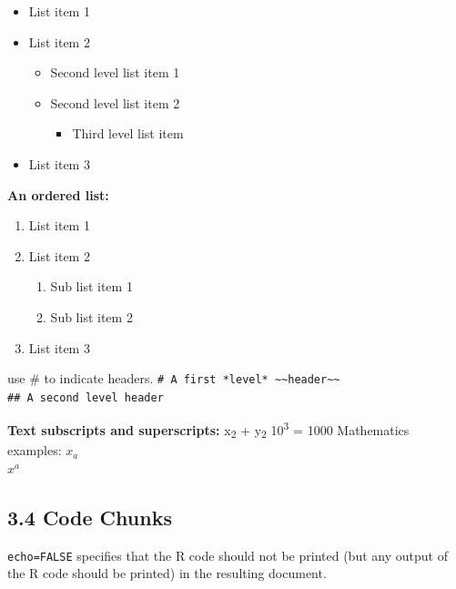 \documentclass[]{article}
\providecommand{\tightlist}{%
  \setlength{\itemsep}{0pt}\setlength{\parskip}{0pt}}
\begin{document}
\begin{itemize}
\tightlist
\item
  List item 1
\item
  List item 2

  \begin{itemize}
  \tightlist
  \item
    Second level list item 1
  \item
    Second level list item 2

    \begin{itemize}
    \tightlist
    \item
      Third level list item
    \end{itemize}
  \end{itemize}
\item
  List item 3
\end{itemize}

\textbf{An ordered list:}

\begin{enumerate}
\def\labelenumi{\arabic{enumi}.}
\tightlist
\item
  List item 1
\item
  List item 2

  \begin{enumerate}
  \def\labelenumii{\alph{enumii}.}
  \setcounter{enumii}{2}
  \tightlist
  \item
    Sub list item 1
  \item
    Sub list item 2
  \end{enumerate}
\item
  List item 3
\end{enumerate}

use \# to indicate headers.
\texttt{\#\ A\ first\ *level*\ \textasciitilde{}\textasciitilde{}header\textasciitilde{}\textasciitilde{}}
\texttt{\#\#\ A\ second\ level\ header}

\textbf{Text subscripts and superscripts:} x\textsubscript{2} +
y\textsubscript{2} 10\textsuperscript{3} = 1000 Mathematics examples:
\(x_a\)\\
\(x^a\)

\subsection{3.4 Code Chunks}\label{code-chunks}

\texttt{echo=FALSE} specifies that the R code should not be printed (but
any output of the R code should be printed) in the resulting document.
\end{document}
